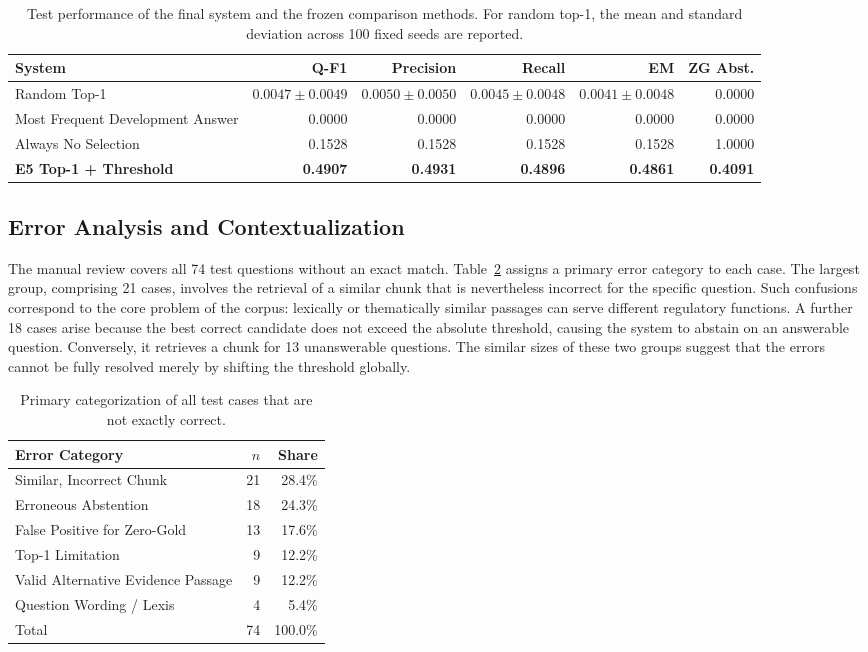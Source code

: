 \documentclass[11pt]{article}
\begin{document}
\begin{table}[t]
\centering
\small
\begin{tabular}{lrrrrr}
\toprule
\textbf{System} & \textbf{Q-F1} & \textbf{Precision} & \textbf{Recall} & \textbf{EM} & \textbf{ZG Abst.} \\
\midrule
Random Top-1 & $0.0047\pm0.0049$ & $0.0050\pm0.0050$ & $0.0045\pm0.0048$ & $0.0041\pm0.0048$ & 0.0000 \\
Most Frequent Development Answer & 0.0000 & 0.0000 & 0.0000 & 0.0000 & 0.0000 \\
Always No Selection & 0.1528 & 0.1528 & 0.1528 & 0.1528 & 1.0000 \\
\textbf{E5 Top-1 + Threshold} & \textbf{0.4907} & \textbf{0.4931} & \textbf{0.4896} & \textbf{0.4861} & \textbf{0.4091} \\
\bottomrule
\end{tabular}
\caption{Test performance of the final system and the frozen comparison methods. For random top-1, the mean and standard deviation across 100 fixed seeds are reported.}
\label{tab:baselines}
\end{table}

\subsection{Error Analysis and Contextualization}

The manual review covers all 74 test questions without an exact match. Table~\ref{tab:error-analysis} assigns a primary error category to each case. The largest group, comprising 21 cases, involves the retrieval of a similar chunk that is nevertheless incorrect for the specific question. Such confusions correspond to the core problem of the corpus: lexically or thematically similar passages can serve different regulatory functions. A further 18 cases arise because the best correct candidate does not exceed the absolute threshold, causing the system to abstain on an answerable question. Conversely, it retrieves a chunk for 13 unanswerable questions. The similar sizes of these two groups suggest that the errors cannot be fully resolved merely by shifting the threshold globally.

\begin{table}[t]
\centering
\small
\begin{tabular}{lrr}
\toprule
\textbf{Error Category} & \textbf{$n$} & \textbf{Share} \\
\midrule
Similar, Incorrect Chunk & 21 & 28.4\% \\
Erroneous Abstention & 18 & 24.3\% \\
False Positive for Zero-Gold & 13 & 17.6\% \\
Top-1 Limitation & 9 & 12.2\% \\
Valid Alternative Evidence Passage & 9 & 12.2\% \\
Question Wording / Lexis & 4 & 5.4\% \\
\midrule
Total & 74 & 100.0\% \\
\bottomrule
\end{tabular}
\caption{Primary categorization of all test cases that are not exactly correct.}
\label{tab:error-analysis}
\end{table}
\end{document}
